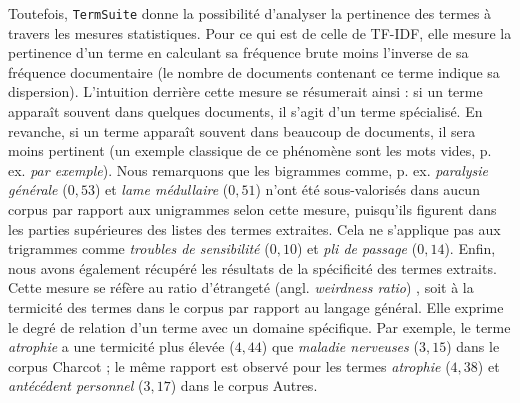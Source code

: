 Toutefois, \texttt{TermSuite} donne la possibilité d'analyser la pertinence des termes à travers les mesures statistiques. Pour ce qui est de celle de \textsc{TF-IDF},
elle mesure la pertinence d'un terme en calculant sa fréquence brute moins l'inverse de sa fréquence documentaire (le nombre de documents contenant ce terme indique sa dispersion). L'intuition derrière cette mesure se résumerait ainsi : si un terme apparaît souvent dans quelques documents, il s'agit d'un terme spécialisé. En revanche, si un terme apparaît souvent dans beaucoup de documents, il sera moins pertinent (un exemple classique de ce phénomène sont les mots vides, p. ex. \textit{par exemple}). 
Nous remarquons que les bigrammes comme, p. ex. \textit{paralysie générale} ($0,53$) et \textit{lame médullaire} ($0,51$) n'ont été sous-valorisés dans aucun corpus par rapport aux unigrammes selon cette mesure, puisqu'ils figurent dans les parties supérieures des listes des termes extraites. Cela ne s'applique pas aux trigrammes comme \textit{troubles de sensibilité} ($0,10$) et \textit{pli de passage} ($0,14$). Enfin, nous avons également récupéré les résultats de la spécificité des termes extraits. Cette mesure se réfère au ratio d'étrangeté (angl. \textit{weirdness ratio}) \citep{khurshid2000weirdness}, soit à la \og{}termicité\fg{} des termes dans le corpus par rapport au langage général. Elle exprime le degré de relation d'un terme avec un domaine spécifique. Par exemple, le terme \textit{atrophie} a une termicité plus élevée ($4,44$) que \textit{maladie nerveuses} ($3,15$) dans le corpus \og{}Charcot\fg{} ; le même rapport est observé pour les termes \textit{atrophie} ($4,38$) et \textit{antécédent personnel} ($3,17$) dans le corpus \og{}Autres\fg{}.

